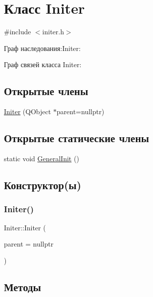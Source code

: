 \hypertarget{class_initer}{}\section{Класс Initer}
\label{class_initer}


{\ttfamily \#include $<$initer.\+h$>$}



Граф наследования\+:Initer\+:


Граф связей класса Initer\+:
\subsection*{Открытые члены}
\begin{DoxyCompactItemize}
\item 
\hyperlink{class_initer_a636ec4c26b2ec95a527ca01e014b8a68}{Initer} (Q\+Object $\ast$parent=nullptr)
\end{DoxyCompactItemize}
\subsection*{Открытые статические члены}
\begin{DoxyCompactItemize}
\item 
static void \hyperlink{class_initer_a088e4b7a4395c32a5bbe932c3db35054}{General\+Init} ()
\end{DoxyCompactItemize}


\subsection{Конструктор(ы)}
\mbox{\label{class_initer_a636ec4c26b2ec95a527ca01e014b8a68}} 
\subsubsection{\texorpdfstring{Initer()}{Initer()}}
{\footnotesize\ttfamily Initer\+::\+Initer (\begin{DoxyParamCaption}\item[{Q\+Object $\ast$}]{parent = {\ttfamily nullptr} }\end{DoxyParamCaption})\hspace{0.3cm}{\ttfamily [explicit]}}



\subsection{Методы}
\mbox{\label{class_initer_a088e4b7a4395c32a5bbe932c3db35054}} 
